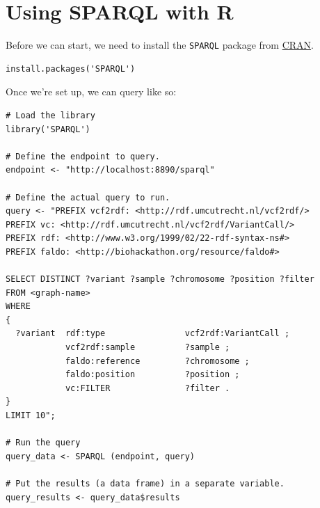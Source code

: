 \documentclass[11pt,a4paper,oneside]{book}
\begin{document}
\section{Using SPARQL with R}
\label{sec:sparql-with-r}

  Before we can start, we need to install the \texttt{SPARQL} package from
  \href{https://cran.r-project.org/web/packages/SPARQL/index.html}{CRAN}.

\begin{siderules}
\begin{verbatim}
install.packages('SPARQL')
\end{verbatim}
\end{siderules}

  Once we're set up, we can query like so:

\begin{siderules}
\begin{verbatim}
# Load the library
library('SPARQL')

# Define the endpoint to query.
endpoint <- "http://localhost:8890/sparql"

# Define the actual query to run.
query <- "PREFIX vcf2rdf: <http://rdf.umcutrecht.nl/vcf2rdf/>
PREFIX vc: <http://rdf.umcutrecht.nl/vcf2rdf/VariantCall/>
PREFIX rdf: <http://www.w3.org/1999/02/22-rdf-syntax-ns#>
PREFIX faldo: <http://biohackathon.org/resource/faldo#>

SELECT DISTINCT ?variant ?sample ?chromosome ?position ?filter
FROM <graph-name>
WHERE
{
  ?variant  rdf:type                vcf2rdf:VariantCall ;
            vcf2rdf:sample          ?sample ;
            faldo:reference         ?chromosome ;
            faldo:position          ?position ;
            vc:FILTER               ?filter .
}
LIMIT 10";

# Run the query
query_data <- SPARQL (endpoint, query)

# Put the results (a data frame) in a separate variable.
query_results <- query_data$results
\end{verbatim}
\end{siderules}
\end{document}
